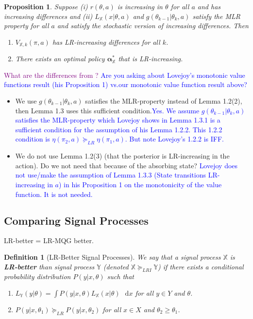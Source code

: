 \documentclass[11pt,onecolumn]{article}
\theoremstyle{plain}
\newtheorem{proposition}{Proposition}[section]
\newtheorem{definition}{Definition}
\newcommand{\iX}[0]{{\mathbb{X}}}
\newcommand{\iY}[0]{{\mathbb{Y}}}
\newcommand\dif{\mathop{}\!\mathrm{d}}
\def\CU#1{\textcolor{purple}{ #1}}
\def\JS#1{\textcolor{blue}{#1}}
\begin{document}
\begin{proposition} Suppose (i) $r(\theta,a)$ is increasing in $\theta$ for all $a$ and has increasing differences and (ii) $L_\iX(x|\theta,a)$ and $g(\theta_{k-1}|\theta_k,a)$ satisfy the MLR property for all $a$ and satisfy the stochastic version of increasing differences. Then
\begin{enumerate}
    \item $V_{\iX,k}(\pi,a)$ has LR-increasing differences for all $k$.
    \item There exists an optimal policy $\boldsymbol{\alpha}_{\iX}^*$ that is LR-increasing.
\end{enumerate}
\end{proposition}



\CU{What are the differences from \cite{lovejoy1987some}? \JS{Are you asking about Lovejoy's monotonic value functions result (his Proposition 1) vs.our monotonic value function result above?}}
\begin{itemize}
    \item We use $g(\theta_{k-1}|\theta_k,a)$ satisfies the MLR-property instead of Lemma 1.2(2), then Lemma 1.3 uses this sufficient condition.\JS{Yes. We assume $g(\theta_{k-1}|\theta_k,a)$ satisfies the MLR-property which Lovejoy shows in Lemma 1.3.1 is a sufficient condition for the assumption of his Lemma 1.2.2. This 1.2.2 condition is $\eta(\pi_2,a) \succeq_{LR} \eta(\pi_1,a)$. But note Lovejoy's 1.2.2 is IFF.}
    \item We do not use Lemma 1.2(3) (that the posterior is LR-increasing in the action). Do we not need that because of the absorbing state? \JS{Lovejoy does not use/make the assumption of Lemma 1.3.3 (State transitions LR-increasing in $a$) in his Proposition 1 on the monotonicity of the value function. It is not needed.}
\end{itemize}


\subsection{Comparing Signal Processes}

LR-better = LR-MQG better.

\begin{definition}[LR-Better Signal Processes]\label{defn:LR-MQG}
    We say that a signal process $\iX$ is \textbf{LR-better} than signal process $\iY$ (denoted $\iX\succeq_{LRI} \iY$) if there exists a conditional probability distribution $P(y|x,\theta)$ such that
    \begin{enumerate}
        \item $L_\iY(y|\theta)=\int P(y|x,\theta)L_\iX(x|\theta)\,\dif x$ for all $y \in Y$ and $\theta$.
        \item $P(y|x,\theta_1) \succeq_{LR} P(y|x,\theta_2)$ for all $x\in X$ and $\theta_2\geq \theta_1$.
    \end{enumerate}
\end{definition}
\end{document}
